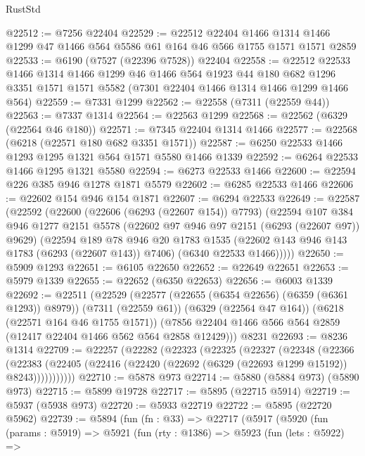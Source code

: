 \begin{lexlean}{RustStd}
\begin{coremodule}
{{@22512 := @7256 @22404
@22529 := @22512
    @22404
    @1466
    @1314
    @1466
    @1299
    @47
    @1466
    @564
    @5586
    @61
    @164
    @46
    @566
    @1755
    @1571
    @1571
    @2859
@22533 := @6190 (@7527 (@22396 @7528)) @22404
@22558 := @22512
    @22533
    @1466
    @1314
    @1466
    @1299
    @46
    @1466
    @564
    @1923
    @44
    @180
    @682
    @1296
    @3351
    @1571
    @1571
    @5582
    (@7301 @22404 @1466 @1314 @1466 @1299 @1466 @564)
@22559 := @7331 @1299
@22562 := @22558 (@7311 (@22559 @44))
@22563 := @7337 @1314
@22564 := @22563 @1299
@22568 := @22562 (@6329 (@22564 @46 @180))
@22571 := @7345 @22404 @1314 @1466
@22577 := @22568 (@6218 (@22571 @180 @682 @3351 @1571))
@22587 := @6250 @22533 @1466 @1293 @1295 @1321 @564 @1571 @5580 @1466 @1339
@22592 := @6264 @22533 @1466 @1295 @1321 @5580
@22594 := @6273 @22533 @1466
@22600 := @22594 @226 @385 @946 @1278 @1871 @5579
@22602 := @6285 @22533 @1466
@22606 := @22602 @154 @946 @154 @1871
@22607 := @6294 @22533
@22649 := @22587
    (@22592
      (@22600
        (@22606 (@6293 (@22607 @154)) @7793)
        (@22594
          @107
          @384
          @946
          @1277
          @2151
          @5578
          (@22602 @97 @946 @97 @2151 (@6293 (@22607 @97)) @9629)
          (@22594
            @189
            @78
            @946
            @20
            @1783
            @1535
            (@22602 @143 @946 @143 @1783 (@6293 (@22607 @143)) @7406)
            (@6340 @22533 @1466)))))
@22650 := @5909 @1293
@22651 := @6105 @22650
@22652 := @22649 @22651
@22653 := @5979 @1339
@22655 := @22652 (@6350 @22653)
@22656 := @6003 @1339
@22692 := @22511
    (@22529
      (@22577 (@22655 (@6354 @22656) (@6359 (@6361 @1293)) @8979))
      (@7311 (@22559 @61))
      (@6329 (@22564 @47 @164))
      (@6218 (@22571 @164 @46 @1755 @1571))
      (@7856 @22404 @1466 @566 @564 @2859 (@12417 @22404 @1466 @562 @564 @2858 @12429)))
    @8231
@22693 := @8236 @1314
@22709 := @22257
    (@22282
      (@22323
        (@22325
          (@22327
            (@22348
              (@22366
                (@22383
                  (@22405 (@22416 (@22420 (@22692 (@6329 (@22693 @1299 @15192)) @8243)))))))))))
@22710 := @5878 @973
@22714 := @5880 (@5884 @973) (@5890 @973)
@22715 := @5899 @19728
@22717 := @5895 (@22715 @5914)
@22719 := @5937 (@5938 @973)
@22720 := @5933 @22719
@22722 := @5895 (@22720 @5962)
@22739 := @5894
    (fun (fn : @33) =>
    @22717
      (@5917
        (@5920
          (fun (params : @5919) =>
          @5921
            (fun (rty : @1386) =>
            @5923
              (fun (lets : @5922) =>
}}
\end{coremodule}
\end{lexlean}
